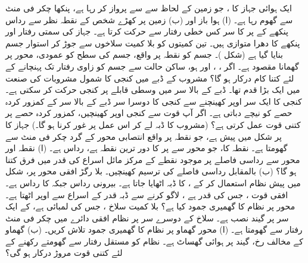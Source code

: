 ایک ہوائی جہاز کا  ، جو زمین کے لحاظ سے  سے پرواز کر رہا ہے، پنکھا  چکر فی منٹ  سے گھوم رہا ہے۔  (ا)  ہوا باز  اور (ب)  زمین پر کھڑے شخص کے نقطہ نظر سے رداس   پنکھے کے   پر کا سر کس خطی رفتار سے حرکت کرتا ہے۔ جہاز کی سمتی رفتار اور   پنکھے  کا دھرا متوازی ہیں۔
تین کمیتوں  کو بلا کمیت سلاخوں سے جوڑ کر استوار جسم بنایا گیا ہے (شکل )۔ جسم کو نقطہ  پر واقع، جسم کی سطح کو عمودی،  محور پر  گھمانا مقصود ہے۔ اگر ، ، اور  ہو، ساکن حالت سے جسم کو  زاوی رفتار تک پہنچانے کے لئے کتنا کام درکار ہو گا؟
مشروب کے ڈبے میں   کنجی   کا شمول  مشروبات    کی صنعت میں    ایک بڑا قدم تھا۔ ڈبے کے بالا  سر میں  وسطی  قابلے پر کنجی    حرکت کر سکتی ہے۔ کنجی  کا ایک سر اوپر کھینچنے سے  کنجی  کا دوسرا سر ڈبے کے بالا سر کے کمزور کردہ  حصے کو نیچے  دباتی  ہے۔ اگر آپ  قوت سے کنجی  اوپر کھینچیں، کمزور  کردہ حصے پر کتنی قوت عمل کرتی ہے؟ (مشروب  کا ڈبہ لے کر اس عمل پر غور کرنا ہو گا۔)
جہاز کا پر شکل  میں پیش ہے، جو نقطہ  پر واقع انتصابی محور کے گرد   چکر فی منٹ  سے گھومتا ہے۔ نقطہ  کا، جو   محور سے پر کا  دور ترین نقطہ ہے، رداس    ہے۔ (ا)  نقطہ  اور محور سے  رداسی فاصلے پر موجود نقطے  کے  مرکز مائل  اسراع کی قدر میں فرق   کتنا ہو گا؟ (ب)   بالمقابل  رداسی فاصلے کی ترسیم کھینچیں۔
بلا رگڑ افقی  محور پر،   شکل  میں پیش نظام استعمال کر کے ،  کا ڈبہ اٹھایا جاتا ہے۔ بیرونی رداس  جبکہ  کا رداس    ہے۔افقی قوت  ، جس کی قدر  ہے  ، لاگو کرنے سے   ڈبہ   قدر کے اسراع  سے اوپر  اٹھتا  ہے۔ محور پر نظام کا گھمیری جمود کیا ہے؟
بلا کمیت سلاخ ، جس کی لمبائی  ہے، کے ایک سر پر  گیند نصب ہے۔  سلاخ کے دوسرے سر پر نظام افقی دائرے میں  چکر فی منٹ رفتار سے گھومتا ہے۔ (ا)  محور گھماو پر نظام کا گھمیری جمود تلاش کریں۔ (ب) گھماو کے مخالف رخ،   گیند پر ہوائی گھساٹ  ہے۔ نظام کو مستقل رفتار سے گھومتے رکھنے کے لئے کتنی قوت مروڑ درکار ہو گی؟
